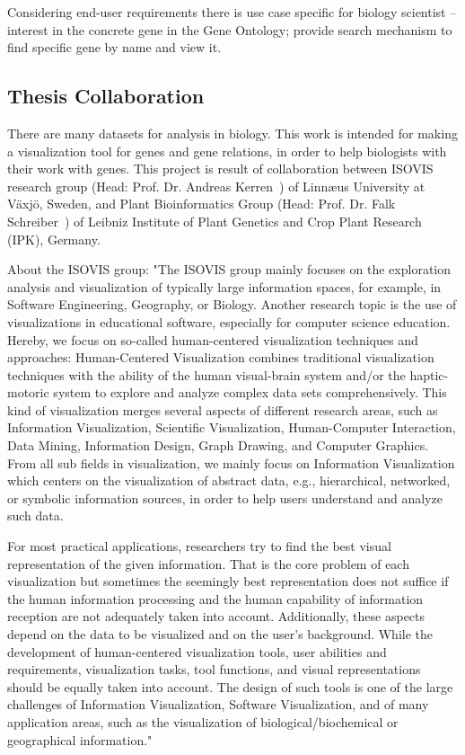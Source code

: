 Considering end-user requirements there is use case specific for biology scientist -- interest in the concrete gene in the Gene Ontology; provide search mechanism to find specific gene by name and view it.


\subsection{Thesis Collaboration}
There are many datasets for analysis in biology. This work is intended for making a visualization tool for genes and gene relations, in order to help biologists
with their work with genes. This project is result of collaboration between ISOVIS research group (Head: Prof. Dr. Andreas Kerren~\cite{Kerren}) of Linn\ae us University at V\"axj\"o, Sweden, and Plant Bioinformatics Group (Head: Prof. Dr. Falk Schreiber~\cite{Schreiber}) of Leibniz Institute of Plant Genetics and Crop Plant Research (IPK), Germany.


About the ISOVIS group: "The ISOVIS group mainly focuses on the exploration analysis and visualization of typically large information spaces, for example, in Software Engineering, Geography, or Biology. Another research topic is the use of visualizations in educational software, especially for computer science education. Hereby, we focus on so-called human-centered visualization techniques and approaches:
Human-Centered Visualization combines traditional visualization techniques with the ability of the human visual-brain system and/or the haptic-motoric system to explore and analyze complex data sets comprehensively. This kind of visualization merges several aspects of different research areas, such as Information Visualization, Scientific Visualization, Human-Computer Interaction, Data Mining, Information Design, Graph Drawing, and Computer Graphics. From all sub fields in visualization, we mainly focus on Information Visualization which centers on the visualization of abstract data, e.g., hierarchical, networked, or symbolic information sources, in order to help users understand and analyze such data.


For most practical applications, researchers try to find the best visual representation of the given information. That is the core problem of each visualization but sometimes the seemingly best representation does not suffice if the human information processing and the human capability of information reception are not adequately taken into account. Additionally, these aspects depend on the data to be visualized and on the user's background. While the development of human-centered visualization tools, user abilities and requirements, visualization tasks, tool functions, and visual representations should be equally taken into account. The design of such tools is one of the large challenges of Information Visualization, Software Visualization, and of many application areas, such as the visualization of biological/biochemical or geographical information."~\cite{ISOVIS}


